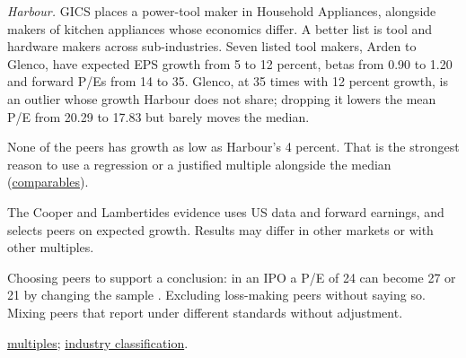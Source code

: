 \begin{qfmethod}
 \emph{Harbour.} GICS places a power-tool maker in Household Appliances, alongside makers of kitchen appliances whose economics differ. A better list is tool and hardware makers across sub-industries. Seven listed tool makers, Arden to Glenco, have expected EPS growth from 5 to 12 percent, betas from 0.90 to 1.20 and forward P/Es from 14 to 35. Glenco, at 35 times with 12 percent growth, is an outlier whose growth Harbour does not share; dropping it lowers the mean P/E from 20.29 to 17.83 but barely moves the median.

None of the peers has growth as low as Harbour's 4 percent. That is the strongest reason to use a regression or a justified multiple alongside the median (\hyperref[meth:comparables-evaluation]{comparables}).

 The Cooper and Lambertides evidence uses US data and forward earnings, and selects peers on expected growth. Results may differ in other markets or with other multiples.

 Choosing peers to support a conclusion: in an IPO a P/E of 24 can become 27 or 21 by changing the sample \citep[p.~21]{investment-valuation-2012}. Excluding loss-making peers without saying so. Mixing peers that report under different standards without adjustment.

 \hyperref[meth:multiples-valuation-basics]{multiples}; \hyperref[meth:industry-analysis]{industry classification}.

\end{qfmethod}

